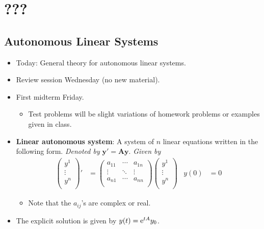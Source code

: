 \documentclass[../notes.tex]{subfiles}
\begin{document}
\chapter{???}
\section{Autonomous Linear Systems}
\begin{itemize}
    \item {}Today: General theory for autonomous linear systems.
    \item Review session Wednesday (no new material).
    \item First midterm Friday.
    \begin{itemize}
        \item Test problems will be slight variations of homework problems or examples given in class.
    \end{itemize}
    \item \textbf{Linear autonomous system}: A system of $n$ linear equations written in the following form. \emph{Denoted by} $\bm{y'=Ay}$. \emph{Given by}
    \begin{align*}
        \begin{pmatrix}
            y^1\\
            \vdots\\
            y^n\\
        \end{pmatrix}'
        &= 
        \begin{pmatrix}
            a_{11} & \cdots & a_{1n}\\
            \vdots & \ddots & \vdots\\
            a_{n1} & \cdots & a_{nn}\\
        \end{pmatrix}
        \begin{pmatrix}
            y^1\\
            \vdots\\
            y^n\\
        \end{pmatrix}&
        y(0) &= 0
    \end{align*}
    \begin{itemize}
        \item Note that the $a_{ij}$'s are complex or real.
    \end{itemize}
    \item The explicit solution is given by $y(t)=\e[tA]y_0$.

\end{itemize}
\end{document}
